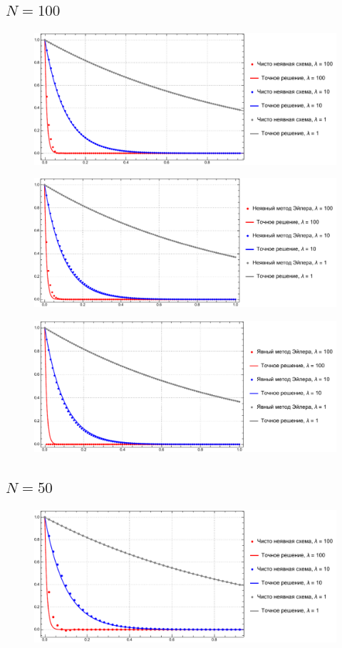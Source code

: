 \documentclass[
11pt,
master, %
subf, %
href, %
colorlinks=true, %
times, %
]{disser}
\begin{document}
\subsection{$N=100$}

\begin{figure}[h!]
  \centering
  \includegraphics[width=0.8\linewidth]{pl1001}
  \caption{}\label{ris:1}
\end{figure}

\begin{figure}[h!]
  \centering
  \includegraphics[width=0.8\linewidth]{pl1002}
  \caption{}\label{ris:2}
\end{figure}

\begin{figure}[h!]
  \centering
  \includegraphics[width=0.8\linewidth]{pl1003}
  \caption{}\label{ris:3}
\end{figure}

\newpage
\subsection{$N=50$}

\begin{figure}[h!]
  \centering
  \includegraphics[width=0.8\linewidth]{pl501}
  \caption{}\label{ris:4}
\end{figure}
\end{document}
